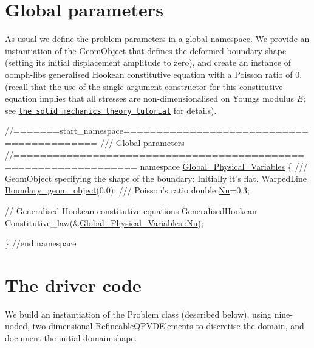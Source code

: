  

\hypertarget{index_namespace}{}\section{Global parameters}\label{index_namespace}
As usual we define the problem parameters in a global namespace. We provide an instantiation of the {\ttfamily Geom\+Object} that defines the deformed boundary shape (setting its initial displacement amplitude to zero), and create an instance of {\ttfamily oomph-\/lib\textquotesingle{}s} generalised Hookean constitutive equation with a Poisson ratio of 0. (recall that the use of the single-\/argument constructor for this constitutive equation implies that all stresses are non-\/dimensionalised on Young\textquotesingle{}s modulus $ E $; see \href{../../solid_theory/html/index.html#non-dim_solid}{\tt the solid mechanics theory tutorial} for details).

 
\begin{DoxyCodeInclude}
\textcolor{comment}{//=======start\_namespace==========================================}
\textcolor{comment}{/// Global parameters}
\textcolor{comment}{}\textcolor{comment}{//================================================================}
\textcolor{keyword}{namespace }\hyperlink{namespaceGlobal__Physical__Variables}{Global\_Physical\_Variables}
\{
\textcolor{comment}{}
\textcolor{comment}{ /// GeomObject specifying the shape of the boundary: Initially it's flat.}
\textcolor{comment}{} \hyperlink{classWarpedLine}{WarpedLine} \hyperlink{namespaceGlobal__Physical__Variables_ab0a184463cbaaa353f2235411adef3c4}{Boundary\_geom\_object}(0.0);
\textcolor{comment}{}
\textcolor{comment}{ /// Poisson's ratio}
\textcolor{comment}{} \textcolor{keywordtype}{double} \hyperlink{namespaceGlobal__Physical__Variables_a9e06f4ada334a9a911aa8cdcfb3ff30b}{Nu}=0.3;

 \textcolor{comment}{// Generalised Hookean constitutive equations}
 GeneralisedHookean Constitutive\_law(&\hyperlink{namespaceGlobal__Physical__Variables_a9e06f4ada334a9a911aa8cdcfb3ff30b}{Global\_Physical\_Variables::Nu});
 
\} \textcolor{comment}{//end namespace}

\end{DoxyCodeInclude}




 

\hypertarget{index_driver}{}\section{The driver code}\label{index_driver}
We build an instantiation of the {\ttfamily Problem} class (described below), using nine-\/noded, two-\/dimensional {\ttfamily Refineable\+Q\+P\+V\+D\+Elements} to discretise the domain, and document the initial domain shape.

